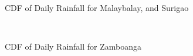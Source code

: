 \begin{figure}[H]
  \centering
  \\
  \\
  \caption{CDF of Daily Rainfall for Malaybalay, and Surigao}
  \label{fig:daily_without_threshold_appendix_wb_pt5}
\end{figure}

\begin{figure}[H]
  \centering
  \\
  \caption{CDF of Daily Rainfall for Zamboanga}
  \label{fig:daily_without_threshold_appendix_wb_pt6}
\end{figure}
